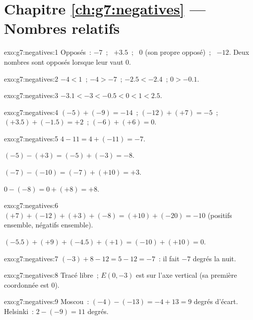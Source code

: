 \section*{Chapitre \ref{ch:g7:negatives} --- Nombres relatifs}

\begin{solution}{exo:g7:negatives:1}
Opposés~: $-7$~; \ $+3.5$~; \ $0$ (son propre opposé)~; \ $-12$. Deux
nombres sont opposés lorsque leur  vaut $0$.
\end{solution}

\begin{solution}{exo:g7:negatives:2}
$-4 < 1$~; \quad $-4 > -7$~; \quad $-2.5 < -2.4$~; \quad $0 > -0.1$.
\end{solution}

\begin{solution}{exo:g7:negatives:3}
$-3.1 < -3 < -0.5 < 0 < 1 < 2.5$.
\end{solution}

\begin{solution}{exo:g7:negatives:4}
$(-5) + (-9) = -14$~; \quad
$(-12) + (+7) = -5$~; \quad
$(+3.5) + (-1.5) = +2$~; \quad
$(-6) + (+6) = 0$.
\end{solution}

\begin{solution}{exo:g7:negatives:5}
$4 - 11 = 4 + (-11) = -7$.

$(-5) - (+3) = (-5) + (-3) = -8$.

$(-7) - (-10) = (-7) + (+10) = +3$.

$0 - (-8) = 0 + (+8) = +8$.
\end{solution}

\begin{solution}{exo:g7:negatives:6}
$(+7) + (-12) + (+3) + (-8) = (+10) + (-20) = -10$ (positifs
ensemble, négatifs ensemble).

$(-5.5) + (+9) + (-4.5) + (+1) = (-10) + (+10) = 0$.
\end{solution}

\begin{solution}{exo:g7:negatives:7}
$(-3) + 8 - 12 = 5 - 12 = -7$~: il fait $-7$ degrés la nuit.
\end{solution}

\begin{solution}{exo:g7:negatives:8}
Tracé libre~; $E(0, -3)$ est sur l'axe vertical (sa première
coordonnée est $0$).
\end{solution}

\begin{solution}{exo:g7:negatives:9}
Moscou~: $(-4) - (-13) = -4 + 13 = 9$ degrés d'écart.
Helsinki~: $2 - (-9) = 11$ degrés.
\end{solution}

